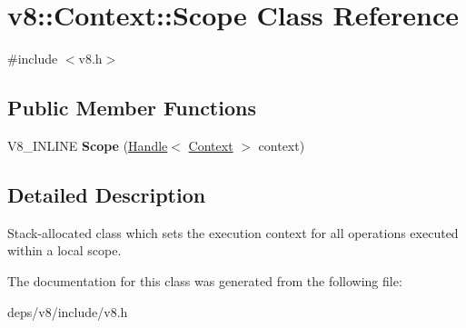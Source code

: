 \hypertarget{classv8_1_1_context_1_1_scope}{}\section{v8\+:\+:Context\+:\+:Scope Class Reference}
\label{classv8_1_1_context_1_1_scope}


{\ttfamily \#include $<$v8.\+h$>$}

\subsection*{Public Member Functions}
\begin{DoxyCompactItemize}
\item 
\hypertarget{classv8_1_1_context_1_1_scope_a171c1cb92354b52c8b1764e88b9540c8}{}V8\+\_\+\+I\+N\+L\+I\+N\+E {\bfseries Scope} (\hyperlink{classv8_1_1_local}{Handle}$<$ \hyperlink{classv8_1_1_context}{Context} $>$ context)\label{classv8_1_1_context_1_1_scope_a171c1cb92354b52c8b1764e88b9540c8}

\end{DoxyCompactItemize}


\subsection{Detailed Description}
Stack-\/allocated class which sets the execution context for all operations executed within a local scope. 

The documentation for this class was generated from the following file\+:\begin{DoxyCompactItemize}
\item 
deps/v8/include/v8.\+h\end{DoxyCompactItemize}
